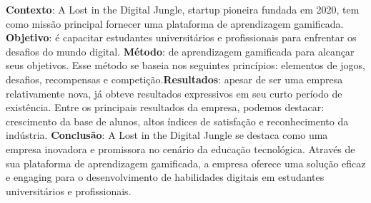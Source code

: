 
\centeredchapterstyle
\begin{resumo}
   \noindent\textbf{Contexto}: A Lost in the Digital Jungle, startup pioneira fundada em 2020, tem como missão principal fornecer uma plataforma de aprendizagem gamificada. \textbf{Objetivo}: é capacitar estudantes universitários e profissionais para enfrentar os desafios do mundo digital. \textbf{Método}: de aprendizagem gamificada para alcançar seus objetivos. Esse método se baseia nos seguintes princípios: elementos de jogos, desafios, recompensas e competição.\textbf{Resultados}: apesar de ser uma empresa relativamente nova, já obteve resultados expressivos em seu curto período de existência. Entre os principais resultados da empresa, podemos destacar: crescimento da base de alunos, altos índices de satisfação e reconhecimento da indústria. \textbf{Conclusão}: A Lost in the Digital Jungle se destaca como uma empresa inovadora e promissora no cenário da educação tecnológica. Através de sua plataforma de aprendizagem gamificada, a empresa oferece uma solução eficaz e engaging para o desenvolvimento de habilidades digitais em estudantes universitários e profissionais.
\end{resumo}